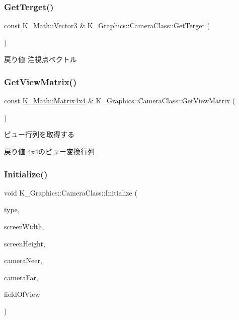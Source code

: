 \subsubsection{\texorpdfstring{Get\+Terget()}{GetTerget()}}
{\footnotesize\ttfamily const \mbox{\hyperlink{namespace_k___math_a66884d78082c39ada4091c211f3570f8}{K\+\_\+\+Math\+::\+Vector3}} \& K\+\_\+\+Graphics\+::\+Camera\+Class\+::\+Get\+Terget (\begin{DoxyParamCaption}{ }\end{DoxyParamCaption})}

\begin{DoxyReturn}{戻り値}
注視点ベクトル 
\end{DoxyReturn}
\mbox{\label{class_k___graphics_1_1_camera_class_a25c8ec2869536e3ba080d5c34749defc}} 
\subsubsection{\texorpdfstring{Get\+View\+Matrix()}{GetViewMatrix()}}
{\footnotesize\ttfamily const \mbox{\hyperlink{namespace_k___math_a345271af9d32dff2c964bc679b13b45c}{K\+\_\+\+Math\+::\+Matrix4x4}} \& K\+\_\+\+Graphics\+::\+Camera\+Class\+::\+Get\+View\+Matrix (\begin{DoxyParamCaption}{ }\end{DoxyParamCaption})}



ビュー行列を取得する 

\begin{DoxyReturn}{戻り値}
4x4のビュー変換行列 
\end{DoxyReturn}
\mbox{\label{class_k___graphics_1_1_camera_class_af9efd95b7a5b0285c5bda70ca01a002a}} 
\subsubsection{\texorpdfstring{Initialize()}{Initialize()}}
{\footnotesize\ttfamily void K\+\_\+\+Graphics\+::\+Camera\+Class\+::\+Initialize (\begin{DoxyParamCaption}\item[{\mbox{\hyperlink{namespace_k___graphics_a46f486e742ad696f88bfbeb22f8af10f}{Camera\+Type}}}]{type,  }\item[{int}]{screen\+Width,  }\item[{int}]{screen\+Height,  }\item[{float}]{camera\+Neer,  }\item[{float}]{camera\+Far,  }\item[{float}]{field\+Of\+View }\end{DoxyParamCaption})}



